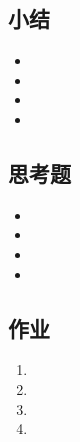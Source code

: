 \documentclass{article}
\begin{document}
\begin{CJK}{UTF8}{gkai}
\subsection{}
\subsection{}

\subsection{小结}
\begin{itemize}
\item
\item
\item
\item 
\end{itemize}

\subsection{思考题}
\begin{itemize}
\item
\item
\item
\item 
\end{itemize}

\subsection{作业}
\begin{enumerate}
\item 
\item
\item
\item
\end{enumerate}



\end{CJK}
\end{document}

